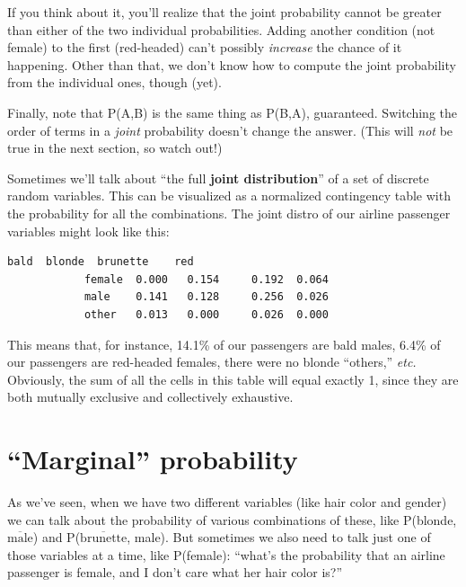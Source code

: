 If you think about it, you'll realize that the joint probability cannot be
greater than either of the two individual probabilities. Adding another
condition (not female) to the first (red-headed) can't possibly
\textit{increase} the chance of it happening. Other than that, we don't know
how to compute the joint probability from the individual ones, though (yet).

Finally, note that P(A,B) is the same thing as P(B,A), guaranteed. Switching
the order of terms in a \textit{joint} probability doesn't change the answer.
(This will \textit{not} be true in the next section, so watch out!)


Sometimes we'll talk about ``the full \textbf{joint distribution}'' of a set of
discrete random variables. This can be visualized as a normalized contingency
table with the probability for all the combinations. The joint distro of our
airline passenger variables might look like this:

\begin{Verbatim}[fontsize=\small,samepage=true,frame=leftline,framesep=5mm,framerule=1mm]
                     bald  blonde  brunette    red
            female  0.000   0.154     0.192  0.064
            male    0.141   0.128     0.256  0.026
            other   0.013   0.000     0.026  0.000
\end{Verbatim}


This means that, for instance, 14.1\% of our passengers are bald males, 6.4\%
of our passengers are red-headed females, there were no blonde ``others,''
\textit{etc.} Obviously, the sum of all the cells in this table will equal
exactly 1, since they are both mutually exclusive and collectively exhaustive.

\section{``Marginal'' probability}


As we've seen, when we have two different variables (like hair color and
gender) we can talk about the probability of various combinations of these,
like P(blonde, $\overline{\textrm{male}}$) and
P($\overline{\textrm{brunette}}$, male). But sometimes we also need to talk
just one of those variables at a time, like P(female): ``what's the probability
that an airline passenger is female, and I don't care what her hair color is?''

